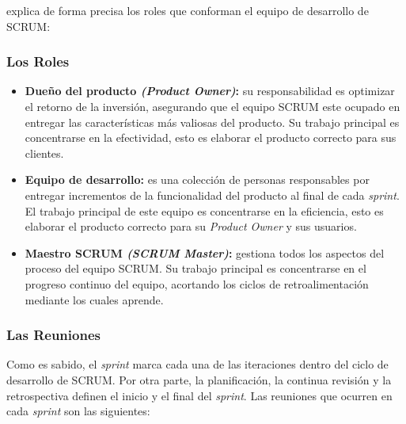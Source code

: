 \cite{Hundermark} explica de forma precisa los roles que conforman el equipo de desarrollo de SCRUM:

		\subsubsection{Los Roles}
			
			\begin{itemize}
				
				\item \textbf{Due\~{n}o del producto \textit{(Product Owner)}:} su responsabilidad es optimizar el retorno de la inversi\'{o}n, asegurando que el equipo SCRUM este ocupado en entregar las caracter\'{i}sticas m\'{a}s valiosas del producto. Su trabajo principal es concentrarse en la efectividad, esto es elaborar el producto correcto para sus clientes.
				
				\item \textbf{Equipo de desarrollo:} es una colecci\'{o}n de personas responsables por entregar incrementos de la funcionalidad del producto al final de cada \textit{sprint}. El trabajo principal de este equipo es concentrarse en la eficiencia, esto es elaborar el producto correcto para su \textit{Product Owner} y sus usuarios.
				
				\item \textbf{Maestro SCRUM \textit{(SCRUM Master)}:} gestiona todos los aspectos del proceso del equipo SCRUM. Su trabajo principal es concentrarse en el progreso continuo del equipo, acortando los ciclos de retroalimentaci\'{o}n mediante los cuales aprende.
				
			\end{itemize}
			
		\subsubsection{Las Reuniones}
			Como es sabido, el \textit{sprint} marca cada una de las iteraciones dentro del ciclo de desarrollo de SCRUM. Por otra parte, la planificaci\'{o}n, la continua revisi\'{o}n y la retrospectiva definen el inicio y el final del \textit{sprint}. Las reuniones que ocurren en cada \textit{sprint} son las siguientes:
			
